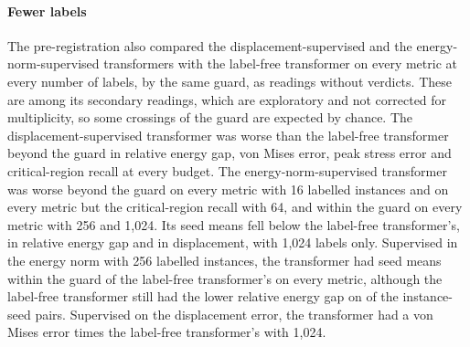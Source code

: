 \paragraph{Fewer labels}
The pre-registration also compared the displacement-supervised and the
energy-norm-supervised transformers with the label-free transformer on every metric at every
number of labels, by the same guard, as readings without verdicts. These are among its
\numCmSecondary{} secondary readings, which are exploratory and not corrected for
multiplicity, so some crossings of the guard are expected by chance. The
displacement-supervised transformer was worse than the label-free transformer beyond the
guard in relative energy gap, von Mises error, peak stress error and critical-region recall
at every budget. The energy-norm-supervised transformer was worse beyond the guard on every
metric with 16 labelled instances and on every metric but the critical-region recall with
64, and within the guard on every metric with 256 and 1,024. Its seed means fell below the
label-free transformer's, in relative energy gap and in displacement, with 1,024 labels
only. Supervised in the energy norm with 256 labelled instances, the transformer had seed means
within the guard of the label-free transformer's on every metric, although the
label-free transformer still had the lower relative energy gap on \numPairCmFreeKnormGapTwoFiveSix{} of the instance-seed pairs. Supervised on the
displacement error, the transformer had a von Mises error \numCmLabOverFreeVm{} times the label-free
transformer's with 1,024.
